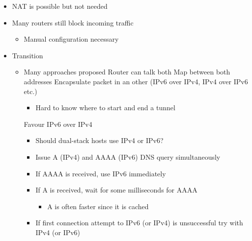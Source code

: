 \begin{itemize}
\begin{itemize}
        \end{itemize}
    \item NAT is possible but not needed
    \item Many routers still block incoming traffic
        \begin{itemize}
            \item Manual configuration necessary
        \end{itemize}
    \item Transition
        \begin{itemize}
            \item Many approaches proposed
                 Router can talk both
                 Map between both addresses
                 Encapsulate packet in an other (IPv6 over IPv4, IPv4 over IPv6 etc.)
                    \begin{itemize}
                        \item Hard to know where to start and end a tunnel
                    \end{itemize}
                 Favour IPv6 over IPv4
                \begin{itemize}
                    \item Should dual-stack hosts use IPv4 or IPv6?
                    \item Issue A (IPv4) and AAAA (IPv6) DNS query simultaneously
                    \item If AAAA is received, use IPv6 immediately
                    \item If A is received, wait for some milliseconds for AAAA
                        \begin{itemize}
                            \item A is often faster since it is cached
                        \end{itemize}
                    \item If first connection attempt to IPv6 (or IPv4) is unsuccessful try with IPv4 (or IPv6)
                \end{itemize}
        \end{itemize}
\end{itemize}


